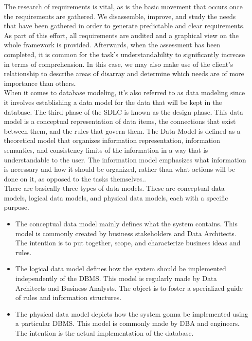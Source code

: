 The research of requirements is vital, as is the basic movement that occurs once the requirements are gathered. We disassemble, improve, and study the needs that have been gathered in order to generate predictable and clear requirements. As part of this effort, all requirements are audited and a graphical view on the whole framework is provided. Afterwards, when the assessment has been completed, it is common for the task's understandability to significantly increase in terms of comprehension. In this case, we may also make use of the client's relationship to describe areas of disarray and determine which needs are of more importance than others.\\

When it comes to database modeling, it's also referred to as data modeling since it involves establishing a data model for the data that will be kept in the database. The third phase of the SDLC is known as the design phase. This data model is a conceptual representation of data items, the connections that exist between them, and the rules that govern them. The Data Model is defined as a theoretical model that organizes information representation, information semantics, and consistency limits of the information in a way that is understandable to the user. The information model emphasizes what information is necessary and how it should be organized, rather than what actions will be done on it, as opposed to the tasks themselves..\\

There are basically three types of data models. These are conceptual data models, logical data models, and physical data models,  each with a specific purpose.\\

\begin{itemize}
  \item The conceptual data model mainly defines what the system contains. This model is commonly created by business stakeholders and Data Architects. The intention is to put together, scope, and characterize business ideas and rules.
  \item The logical data model defines how the system should be implemented independently of the DBMS. This model is regularly made by Data Architects and Business Analysts. The object is to foster a specialized guide of rules and information structures.
  \item The physical data model depicts how the system gonna be implemented using a particular DBMS. This model is commonly made by DBA and engineers. The intention is the actual implementation of the database.
\end{itemize}

